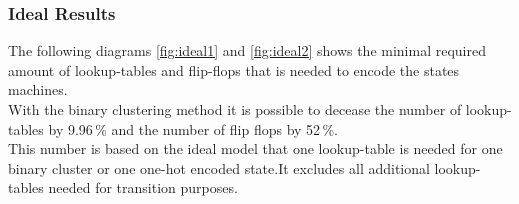 \subsubsection{Ideal Results}
\label{subsubsec:IResults}

The following diagrams \ref{fig:ideal1} and \ref{fig:ideal2} shows the minimal required amount of lookup-tables and flip-flops that is needed to encode the states machines. \\
With the binary clustering method it is possible to decease the number of lookup-tables by 9.96\,\% and the number of flip flops by 52\,\%.\\

This number is based on the ideal model that one lookup-table is needed for one binary cluster or one one-hot encoded state.It excludes all additional lookup-tables needed for transition purposes.

